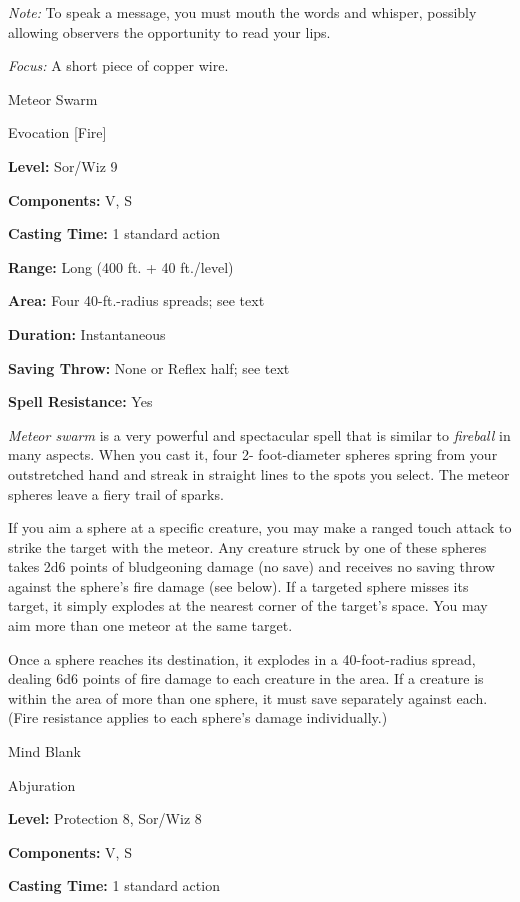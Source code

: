 \documentclass{article}
\begin{document}
\textit{Note: }To speak a message, you must mouth the words and whisper, possibly 
allowing observers the opportunity to read your lips.

\textit{Focus: }A short piece of copper wire.

\vspace{12pt}
Meteor Swarm

Evocation [Fire]

\textbf{Level:} Sor/Wiz 9

\textbf{Components:} V, S

\textbf{Casting Time:} 1 standard action

\textbf{Range:} Long (400 ft. + 40 ft./level)

\textbf{Area:} Four 40-ft.-radius spreads; see text

\textbf{Duration:} Instantaneous

\textbf{Saving Throw:} None or Reflex half; see text

\textbf{Spell Resistance:} Yes

\textit{Meteor swarm }is a very powerful and spectacular spell that is similar 
to \textit{fireball }in many aspects. When you cast it, four 2- foot-diameter spheres 
spring from your outstretched hand and streak in straight lines to the spots you 
select. The meteor spheres leave a fiery trail of sparks.

If you aim a sphere at a specific creature, you may make a ranged touch attack 
to strike the target with the meteor. Any creature struck by one of these spheres 
takes 2d6 points of bludgeoning damage (no save) and receives no saving throw against 
the sphere's fire damage (see below). If a targeted sphere misses its target, it 
simply explodes at the nearest corner of the target's space. You may aim more than 
one meteor at the same target.

Once a sphere reaches its destination, it explodes in a 40-foot-radius spread, 
dealing 6d6 points of fire damage to each creature in the area. If a creature is 
within the area of more than one sphere, it must save separately against each. 
(Fire resistance applies to each sphere's damage individually.)

\vspace{12pt}
Mind Blank

Abjuration

\textbf{Level:} Protection 8, Sor/Wiz 8

\textbf{Components:} V, S

\textbf{Casting Time:} 1 standard action
\end{document}
